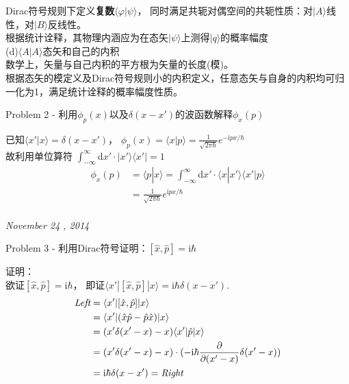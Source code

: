 \documentclass[a4paper]{article}
\newcommand{\dis}{\displaystyle}
\begin{document}
\begin{CJK*}{UTF8}{song}
{	\indent Dirac符号规则下定义\textbf{复数}$\langle\varphi | \psi\rangle$，
	同时满足共轭对偶空间的共轭性质：对$|A\rangle$线性，对$|B\rangle$反线性。\\
	\indent 根据统计诠释，其物理内涵应为在态矢$|\psi\rangle$上测得$|q\rangle$的概率幅度\\
	(d)$\langle A|A\rangle$态矢和自己的内积\\
	\indent 数学上，矢量与自己内积的平方根为矢量的长度(模)。\\
	\indent 根据态矢的模定义及Dirac符号规则小的内积定义，任意态矢与自身的内积均可归一化为1，满足统计诠释的概率幅度性质。
    }\\[20pt]
    \begin{CJK*}{UTF8}{hei}
    	\noindent Problem 2 - 
    	利用$\phi_{p}(x)$以及$\delta(x - x')$的波函数解释$\phi_{x}(p)$\\[12pt]
    \end{CJK*}
    {
	\indent 已知$\langle x' | x\rangle = \delta(x-x')$，
	$\dis\phi_{p}(x)=\langle x|p\rangle = 
		\frac{1}{\sqrt{2\pi\hbar}}e^{-\mathrm{i}px/\hbar}
		$\\
	\indent 故利用单位算符
	$\dis\int_{-\infty}^{\infty}\mathrm{d}x'\cdot |x'\rangle\langle x'| = 1$\\
	\begin{equation*}\begin{split}
	\phi_{x}(p)
		&=\langle p|x\rangle
		 =\int_{-\infty}^{\infty}\mathrm{d}x'\cdot\langle x |x'\rangle\langle x'|p\rangle\\
		&=  \frac{1}{\sqrt{2\pi\hbar}}e^{\mathrm{i}px/\hbar}
	\end{split}\end{equation*}
    }\\[40pt]
    \noindent\Large{\emph{November 24 , 2014}}\\[15pt]    
    \begin{CJK*}{UTF8}{hei}
    	\noindent Problem 3 - 
    	利用Dirac符号证明：$[\hat{x},\hat{p}]=\mathrm{i}\hbar$\\[12pt]
    \end{CJK*}
    {
	\noindent 证明：\\[5pt]
	\indent 欲证$[\hat{x},\hat{p}]=\mathrm{i}\hbar$，
		即证$\langle x'|[\hat{x},\hat{p}]|x\rangle=\mathrm{i}\hbar\delta(x-x')$.
	\begin{equation*}\begin{split}
		\emph{Left}
			& = \langle x'|[\hat{x},\hat{p}]|x\rangle\\
			& =  \langle x'|(\hat{x}\hat{p} - \hat{p}\hat{x})|x\rangle\\
			& = (x'\delta(x'-x)-x)\langle x'|\hat{p}|x\rangle\\
			& =  (x'\delta(x'-x)-x)\cdot(-\mathrm{i}\hbar\frac{\partial}{\partial(x'-x)}\delta(x'-x))\\
			& =\mathrm{i}\hbar\delta(x-x') = \emph{Right}
	\end{split}\end{equation*}
    }\\[40pt]
    \end{CJK*}
\end{document}
